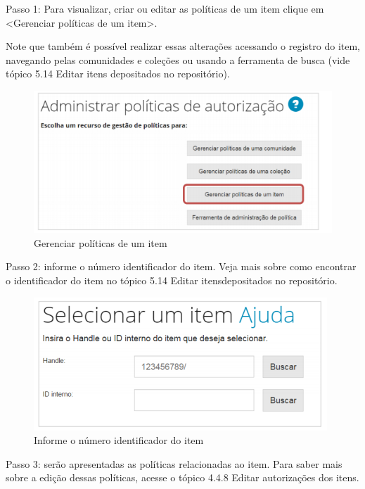 \documentclass[12pt,hidelinks]{article}
\begin{document}
    Passo 1: Para visualizar, criar ou editar as políticas de um item clique em <Gerenciar políticas de um item>.
    
    \singlespacing
    
    Note que também é possível realizar essas alterações acessando o registro do item, navegando pelas comunidades e coleções ou usando a ferramenta de busca (vide tópico 5.14 Editar itens depositados no repositório).
    
    \begin{figure}[!htp]
                \centering
                \includegraphics[scale=0.8]{figura/Figura80.png}
                \caption{Gerenciar políticas de um item}
            \label{Rotulo}
        \end{figure}
    
    \singlespacing
    
    Passo 2: informe o número identificador do item. Veja mais sobre como encontrar o identificador do item no tópico 5.14 Editar itensdepositados no repositório.
    
    \begin{figure}[!htp]
                \centering
                \includegraphics[scale=0.8]{figura/Figura81.png}
                \caption{Informe o número identificador do item}
            \label{Rotulo}
        \end{figure}
    
    Passo 3: serão apresentadas as políticas relacionadas ao item. Para saber mais sobre a edição dessas políticas, acesse o tópico 4.4.8 Editar autorizações dos itens.
    
\end{document}
